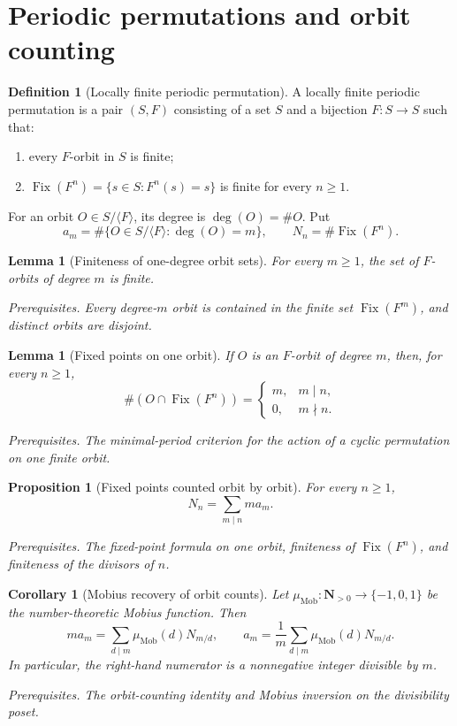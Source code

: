 \documentclass[10pt]{article}
\newtheorem{proposition}[theorem]{Proposition}
\newtheorem{corollary}[theorem]{Corollary}
\newtheorem{lemma}[theorem]{Lemma}
\theoremstyle{definition}
\newtheorem{definition}[theorem]{Definition}
\newcommand{\Fix}{\operatorname{Fix}}
\newcommand{\deps}[1]{\par\smallskip\noindent\textit{Prerequisites.} #1}
\begin{document}
\section{Periodic permutations and orbit counting}

\begin{definition}[Locally finite periodic permutation]
A locally finite periodic permutation is a pair \((S,F)\) consisting of a
set \(S\) and a bijection \(F:S\to S\) such that:
\begin{enumerate}[label=\textup{(\roman*)}]
\item every \(F\)-orbit in \(S\) is finite;
\item \(\Fix(F^n)=\{s\in S:F^n(s)=s\}\) is finite for every \(n\geq1\).
\end{enumerate}
For an orbit \(O\in S/\langle F\rangle\), its degree is
\(\deg(O)=\#O\).  Put
\[
 a_m=\#\{O\in S/\langle F\rangle:\deg(O)=m\},
 \qquad N_n=\#\Fix(F^n).
\]
\end{definition}

\begin{lemma}[Finiteness of one-degree orbit sets]
For every \(m\geq1\), the set of \(F\)-orbits of degree \(m\) is finite.
\deps{Every degree-\(m\) orbit is contained in the finite set
\(\Fix(F^m)\), and distinct orbits are disjoint.}
\end{lemma}

\begin{lemma}[Fixed points on one orbit]
If \(O\) is an \(F\)-orbit of degree \(m\), then, for every \(n\geq1\),
\[
 \#(O\cap\Fix(F^n))=
 \begin{cases}
  m,&m\mid n,\\
  0,&m\nmid n.
 \end{cases}
\]
\deps{The minimal-period criterion for the action of a cyclic permutation
on one finite orbit.}
\end{lemma}

\begin{proposition}[Fixed points counted orbit by orbit]
For every \(n\geq1\),
\[
 N_n=\sum_{m\mid n}m a_m.
\]
\deps{The fixed-point formula on one orbit, finiteness of \(\Fix(F^n)\),
and finiteness of the divisors of \(n\).}
\end{proposition}

\begin{corollary}[Mobius recovery of orbit counts]
Let \(\mu_{\mathrm{Mob}}:\mathbf N_{>0}\to\{-1,0,1\}\) be the
number-theoretic Mobius function.  Then
\[
 m a_m=\sum_{d\mid m}\mu_{\mathrm{Mob}}(d)N_{m/d},
 \qquad
 a_m=\frac1m\sum_{d\mid m}\mu_{\mathrm{Mob}}(d)N_{m/d}.
\]
In particular, the right-hand numerator is a nonnegative integer divisible
by \(m\).
\deps{The orbit-counting identity and Mobius inversion on the divisibility
poset.}
\end{corollary}
\end{document}
